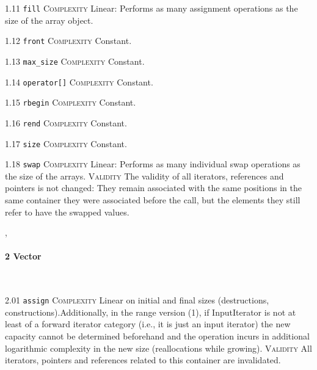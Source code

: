 \noindent\textcolor{corange}{1.11 \texttt{fill}} \textsc{Complexity} Linear: Performs as many assignment operations as the size of the array object. \vspace{0.5em}

\noindent\textcolor{cgreen}{1.12 \texttt{front}} \textsc{Complexity} Constant. \vspace{0.5em}

\noindent\textcolor{cgreen}{1.13 \texttt{max\_size}} \textsc{Complexity} Constant. \vspace{0.5em}

\noindent\textcolor{cgreen}{1.14 \texttt{operator[]}} \textsc{Complexity} Constant. \vspace{0.5em}

\noindent\textcolor{cgreen}{1.15 \texttt{rbegin}} \textsc{Complexity} Constant. \vspace{0.5em}

\noindent\textcolor{cgreen}{1.16 \texttt{rend}} \textsc{Complexity} Constant. \vspace{0.5em}

\noindent\textcolor{cgreen}{1.17 \texttt{size}} \textsc{Complexity} Constant. \vspace{0.5em}

\noindent\textcolor{corange}{1.18 \texttt{swap}} \textsc{Complexity} Linear: Performs as many individual swap operations as the size of the arrays. \textsc{Validity} The validity of all iterators, references and pointers is not changed: They remain associated with the same positions in the same container they were associated before the call, but the elements they still refer to have the swapped values.\vspace{0.5em}


\sep
{}
\paragraph{2 Vector}\mbox{}\\
\noindent\textcolor{corange}{2.01 \texttt{assign}} \textsc{Complexity} Linear on initial and final sizes (destructions, constructions).Additionally, in the range version (1), if InputIterator is not at least of a forward iterator category (i.e., it is just an input iterator) the new capacity cannot be determined beforehand and the operation incurs in additional logarithmic complexity in the new size (reallocations while growing). \textsc{Validity} All iterators, pointers and references related to this container are invalidated.\vspace{0.5em}

